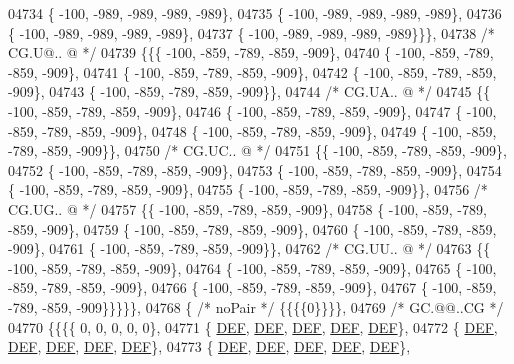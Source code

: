 \begin{DoxyCode}
04734 \{ -100, -989, -989, -989, -989\},
04735 \{ -100, -989, -989, -989, -989\},
04736 \{ -100, -989, -989, -989, -989\},
04737 \{ -100, -989, -989, -989, -989\}\}\},
04738 \textcolor{comment}{/* CG.U@.. @ */}
04739 \{\{\{ -100, -859, -789, -859, -909\},
04740 \{ -100, -859, -789, -859, -909\},
04741 \{ -100, -859, -789, -859, -909\},
04742 \{ -100, -859, -789, -859, -909\},
04743 \{ -100, -859, -789, -859, -909\}\},
04744 \textcolor{comment}{/* CG.UA.. @ */}
04745 \{\{ -100, -859, -789, -859, -909\},
04746 \{ -100, -859, -789, -859, -909\},
04747 \{ -100, -859, -789, -859, -909\},
04748 \{ -100, -859, -789, -859, -909\},
04749 \{ -100, -859, -789, -859, -909\}\},
04750 \textcolor{comment}{/* CG.UC.. @ */}
04751 \{\{ -100, -859, -789, -859, -909\},
04752 \{ -100, -859, -789, -859, -909\},
04753 \{ -100, -859, -789, -859, -909\},
04754 \{ -100, -859, -789, -859, -909\},
04755 \{ -100, -859, -789, -859, -909\}\},
04756 \textcolor{comment}{/* CG.UG.. @ */}
04757 \{\{ -100, -859, -789, -859, -909\},
04758 \{ -100, -859, -789, -859, -909\},
04759 \{ -100, -859, -789, -859, -909\},
04760 \{ -100, -859, -789, -859, -909\},
04761 \{ -100, -859, -789, -859, -909\}\},
04762 \textcolor{comment}{/* CG.UU.. @ */}
04763 \{\{ -100, -859, -789, -859, -909\},
04764 \{ -100, -859, -789, -859, -909\},
04765 \{ -100, -859, -789, -859, -909\},
04766 \{ -100, -859, -789, -859, -909\},
04767 \{ -100, -859, -789, -859, -909\}\}\}\}\},
04768 \{ \textcolor{comment}{/* noPair */} \{\{\{\{0\}\}\}\},
04769 \textcolor{comment}{/* GC.@@..CG */}
04770 \{\{\{\{    0,    0,    0,    0,    0\},
04771 \{  \mbox{\hyperlink{1_88_84__epars_8h_a397419fc12b37ed479c8abb9d444d843}{DEF}},  \mbox{\hyperlink{1_88_84__epars_8h_a397419fc12b37ed479c8abb9d444d843}{DEF}},  \mbox{\hyperlink{1_88_84__epars_8h_a397419fc12b37ed479c8abb9d444d843}{DEF}},  \mbox{\hyperlink{1_88_84__epars_8h_a397419fc12b37ed479c8abb9d444d843}{DEF}},  \mbox{\hyperlink{1_88_84__epars_8h_a397419fc12b37ed479c8abb9d444d843}{DEF}}\},
04772 \{  \mbox{\hyperlink{1_88_84__epars_8h_a397419fc12b37ed479c8abb9d444d843}{DEF}},  \mbox{\hyperlink{1_88_84__epars_8h_a397419fc12b37ed479c8abb9d444d843}{DEF}},  \mbox{\hyperlink{1_88_84__epars_8h_a397419fc12b37ed479c8abb9d444d843}{DEF}},  \mbox{\hyperlink{1_88_84__epars_8h_a397419fc12b37ed479c8abb9d444d843}{DEF}},  \mbox{\hyperlink{1_88_84__epars_8h_a397419fc12b37ed479c8abb9d444d843}{DEF}}\},
04773 \{  \mbox{\hyperlink{1_88_84__epars_8h_a397419fc12b37ed479c8abb9d444d843}{DEF}},  \mbox{\hyperlink{1_88_84__epars_8h_a397419fc12b37ed479c8abb9d444d843}{DEF}},  \mbox{\hyperlink{1_88_84__epars_8h_a397419fc12b37ed479c8abb9d444d843}{DEF}},  \mbox{\hyperlink{1_88_84__epars_8h_a397419fc12b37ed479c8abb9d444d843}{DEF}},  \mbox{\hyperlink{1_88_84__epars_8h_a397419fc12b37ed479c8abb9d444d843}{DEF}}\},

\end{DoxyCode}
